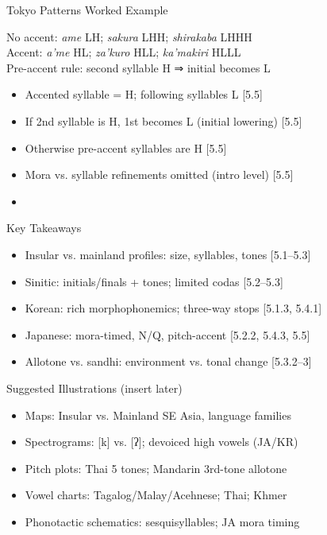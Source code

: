 \documentclass{beamer}
\newcommand{\booksrc}[1]{\hfill {\tiny [#1]}}
\begin{document}
\begin{frame}{Tokyo Patterns Worked Example}
\begin{exe}
\ex No accent: \textit{ame} LH; \textit{sakura} LHH; \textit{shirakaba} LHHH \\
\ex Accent: \textit{a’me} HL; \textit{za’kuro} HLL; \textit{ka’makiri} HLLL \\
\ex Pre-accent rule: second syllable H ⇒ initial becomes L
\end{exe}
\begin{itemize}
\item Accented syllable = H; following syllables L \booksrc{5.5}
\item If 2nd syllable is H, 1st becomes L (initial lowering) \booksrc{5.5}
\item Otherwise pre-accent syllables are H \booksrc{5.5}
\item Mora vs. syllable refinements omitted (intro level) \booksrc{5.5}
\item %
\end{itemize}
\end{frame}


\begin{frame}{Key Takeaways}
\begin{itemize}
\item Insular vs. mainland profiles: size, syllables, tones \booksrc{5.1–5.3}
\item Sinitic: initials/finals + tones; limited codas \booksrc{5.2–5.3}
\item Korean: rich morphophonemics; three-way stops \booksrc{5.1.3, 5.4.1}
\item Japanese: mora-timed, N/Q, pitch-accent \booksrc{5.2.2, 5.4.3, 5.5}
\item Allotone vs. sandhi: environment vs. tonal change \booksrc{5.3.2–3}
\end{itemize}
\end{frame}

\begin{frame}{Suggested Illustrations (insert later)}
\begin{itemize}
\item Maps: Insular vs. Mainland SE Asia, language families
\item Spectrograms: [k] vs. [ʔ]; devoiced high vowels (JA/KR)
\item Pitch plots: Thai 5 tones; Mandarin 3rd-tone allotone
\item Vowel charts: Tagalog/Malay/Acehnese; Thai; Khmer
\item Phonotactic schematics: sesquisyllables; JA mora timing
\end{itemize}
\end{frame}
\end{document}
